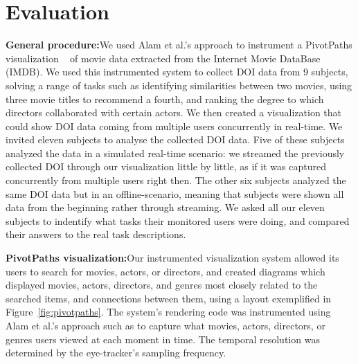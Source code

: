 \section{Evaluation}
\label{sec:Evaluation}

\textbf{General procedure:}We used Alam et al.'s approach to instrument a PivotPaths visualization ~\cite{dork2012pivotpaths} of movie data extracted from the Internet Movie DataBase (IMDB). We used this instrumented system to collect DOI data from 9 subjects, solving a range of tasks such as identifying similarities between two movies, using three movie titles to recommend a fourth, and ranking the degree to which directors collaborated with certain actors. We then created a visualization that could show DOI data coming from multiple users concurrently in real-time. We invited eleven subjects to analyse the collected DOI data. Five of these subjects analyzed the data in a simulated real-time scenario: we streamed the previously collected DOI through our visualization little by little, as if it was captured concurrently from multiple users right then. The other six subjects analyzed the same DOI data but in an offline-scenario, meaning that subjects were shown all data from the beginning rather through streaming. We asked all our eleven subjects to indentify what tasks their monitored users were doing, and compared their answers to the real task descriptions.

\textbf{PivotPaths visualization:}Our instrumented visualization system allowed its users to search for movies, actors, or directors, and created diagrams which displayed movies, actors, directors, and genres most closely related to the searched items, and connections between them, using a layout exemplified in Figure~\ref{fig:pivotpaths}. The system's rendering code was instrumented using Alam et al.'s approach such as to capture what movies, actors, directors, or genres users viewed at each moment in time. The temporal resolution was determined by the eye-tracker's sampling frequency.

